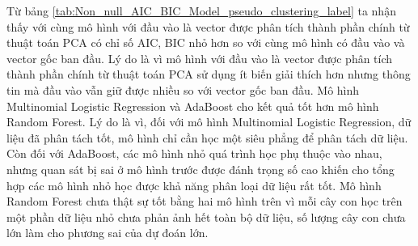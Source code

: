 Từ bảng \ref{tab:Non_null_AIC_BIC_Model_pseudo_clustering_label} ta nhận thấy với cùng mô hình với đầu vào là vector được phân tích thành phần chính từ thuật toán PCA có chỉ số AIC, BIC nhỏ hơn so với cùng mô hình có đầu vào và vector gốc ban đầu.
Lý do là vì mô hình với đầu vào là vector được phân tích thành phần chính từ thuật toán PCA sử dụng ít biến giải thích hơn nhưng thông tin mà đầu vào vẫn giữ được nhiều so với vector gốc ban đầu.
Mô hình Multinomial Logistic Regression và AdaBoost cho kết quả tốt hơn mô hình Random Forest.
Lý do là vì, đối với mô hình Multinomial Logistic Regression, dữ liệu đã phân tách tốt, mô hình chỉ cần học một siêu phẳng để phân tách dữ liệu.
Còn đối với AdaBoost, các mô hình nhỏ quá trình học phụ thuộc vào nhau, nhưng quan sát bị sai ở mô hình trước được đánh trọng số cao khiến cho tổng hợp các mô hình nhỏ học được khả năng phân loại dữ liệu rất tốt.
Mô hình Random Forest chưa thật sự tốt bằng hai mô hình trên vì mỗi cây con học trên một phần dữ liệu nhỏ chưa phản ảnh hết toàn bộ dữ liệu, số lượng cây con chưa lớn làm cho phương sai của dự đoán lớn.

